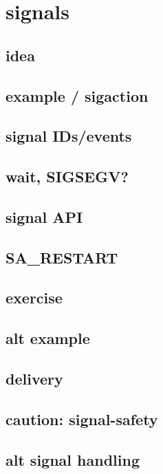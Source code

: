 \section{signals}

\subsection{idea}



\subsection{example / sigaction}



\subsection{signal IDs/events}




\subsection{wait, SIGSEGV?}



\subsection{signal API}



\subsection{SA\_RESTART}



\subsection{exercise}


\subsection{alt example}


\subsection{delivery}



\subsection{caution: signal-safety}



\subsection{alt signal handling}



